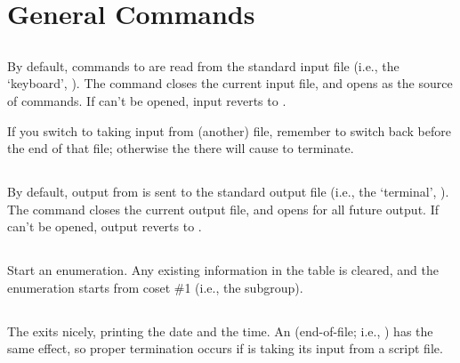 \section{General Commands}
\label{sec:general}

\subsection{}
\label{cmd:ai}
\label{cmd:alter input}

By default, commands to {\ace} are read from the standard input file
  (i.e., the `keyboard'\kern-1.5pt, ).
The  command closes the current input file, and opens
   as the source of commands.
If  can't be opened, input reverts to .

If you switch to taking input from (another) file, remember to switch back
  before the end of that file; otherwise the  there will cause
  {\ace} to terminate.

\subsection{}
\label{cmd:ao}
\label{cmd:alter output}

By default, output from {\ace} is sent to the standard output file
  (i.e., the `terminal'\kern-1.5pt, ).
The  command closes the current output file, and opens
   for all future output.
If  can't be opened, output reverts to .

\subsection{}
\label{cmd:begin}

Start an enumeration.
Any existing information in the table is cleared, and the enumeration
  starts from coset \#1 (i.e., the subgroup).

\subsection{}
\label{cmd:bye}

The exits {\ace} nicely, printing the date and the time.
An  (end-of-file; i.e., ) has the same effect, so 
  proper termination occurs if {\ace} is taking its input from a script
  file.

